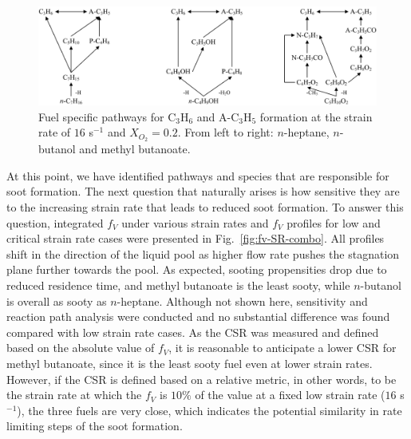 \documentclass[review,3p,times]{elsarticleUS}
\begin{document}
\begin{figure}[h]
  \centering
  \scriptsize
  \includegraphics[width=1.0\textwidth]{Pathways_Fuel.png}
  \normalsize
  \caption{Fuel specific pathways for C$_3$H$_6$ and A-C$_3$H$_5$ formation at the strain rate of $16$ s$^{-1}$ and $X_{O_2}=0.2$. From left to right: $n$-heptane, $n$-butanol and methyl butanoate.}
  \label{fig:Pathways_Fuel}
\end{figure}
At this point, we have identified pathways and species that are responsible for soot formation. The next question that naturally arises is how sensitive they are to the increasing strain rate that leads to reduced soot formation. To answer this question, integrated $f_V$ under various strain rates and $f_V$ profiles for low and critical strain rate cases were presented in Fig.~\ref{fig:fv-SR-combo}. All profiles shift in the direction of the liquid pool as higher flow rate pushes the stagnation plane further towards the pool. As expected, sooting propensities drop due to reduced residence time, and methyl butanoate is the least sooty, while $n$-butanol is overall as sooty as $n$-heptane. Although not shown here, sensitivity and reaction path analysis were conducted and no substantial difference was found compared with low strain rate cases. As the CSR was measured and defined based on the absolute value of $f_V$, it is reasonable to anticipate a lower CSR for methyl butanoate, since it is the least sooty fuel even at lower strain rates. However, if the CSR is defined based on a relative metric, in other words, to be the strain rate at which the $f_V$ is $10\%$ of the value at a fixed low strain rate ($16$ s$^{-1}$), the three fuels are very close, which indicates the potential similarity in rate limiting steps of the soot formation.
\end{document}
